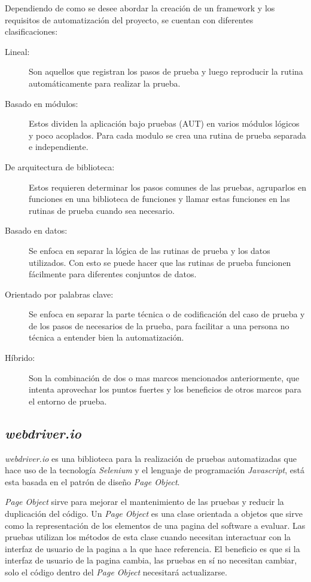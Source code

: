 Dependiendo de como se desee abordar la creación de un framework y los
requisitos de automatización del proyecto, se cuentan con diferentes
clasificaciones:

\begin{description}
    \item [Lineal:] Son aquellos que registran los pasos de prueba y luego
        reproducir la rutina automáticamente para realizar la prueba.
    \item [Basado en módulos:] Estos dividen la aplicación bajo pruebas (AUT) en
        varios módulos lógicos y poco acoplados. Para cada modulo se crea una
        rutina de prueba separada e independiente.
    \item [De arquitectura de biblioteca:] Estos requieren determinar los pasos
        comunes de las pruebas, agruparlos en funciones en una biblioteca de
        funciones y llamar estas funciones en las rutinas de prueba cuando sea
        necesario.
    \item [Basado en datos:] Se enfoca en separar la lógica de las rutinas de
        prueba y los datos utilizados. Con esto se puede hacer que las rutinas
        de prueba funcionen fácilmente para diferentes conjuntos de datos.
    \item [Orientado por palabras clave:] Se enfoca en separar la parte técnica
        o de codificación del caso de prueba y de los pasos de necesarios de la
        prueba, para facilitar a una persona no técnica a entender bien la
        automatización.
    \item [Híbrido:] Son la combinación de dos o mas marcos mencionados
        anteriormente, que intenta aprovechar los puntos fuertes y los
        beneficios de otros marcos para el entorno de prueba.
\end{description}

\subsection{\emph{webdriver.io}}
\emph{webdriver.io} es una biblioteca para la realización de pruebas
automatizadas que hace uso de la tecnología \emph{Selenium} y el lenguaje de
programación \emph{Javascript}, está esta basada en el patrón de diseño
\emph{Page Object}.

\emph{Page Object} sirve para mejorar el mantenimiento de las pruebas y reducir
la duplicación del código. Un \emph{Page Object} es una clase orientada a
objetos que sirve como la representación de los elementos de una pagina del
software a evaluar. Las pruebas utilizan los métodos de esta clase cuando
necesitan interactuar con la interfaz de usuario de la pagina a la que hace
referencia. El beneficio es que si la interfaz de usuario de la pagina cambia,
las pruebas en sí no necesitan cambiar, solo el código dentro del
\emph{Page Object} necesitará actualizarse.

